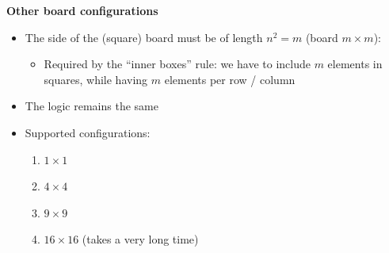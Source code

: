 \documentclass[t,aspectratio=1610]{beamer}
\newcounter{row}
\newcounter{col}
\begin{document}
\begin{frame}
\textbf{Other board configurations} \\
\vspace{1em}
\begin{itemize}
\item The side of the (square) board must be of length $ n^2 = m $
      (board $ m \times m$):
      \begin{itemize}
      \item Required by the ``inner boxes'' rule: we have to include $ m $
            elements in squares, while having $ m $ elements per row / column
      \end{itemize}
\vspace{1em}
\item The logic remains the same
\vspace{1em}
\item Supported configurations:
      \begin{enumerate}
      \item $ 1 \times 1 $
      \item $ 4 \times 4 $
      \item $ 9 \times 9 $
      \item $ 16 \times 16 $ (takes a very long time)
      \end{enumerate}
\end{itemize}
\end{frame}
\end{document}
